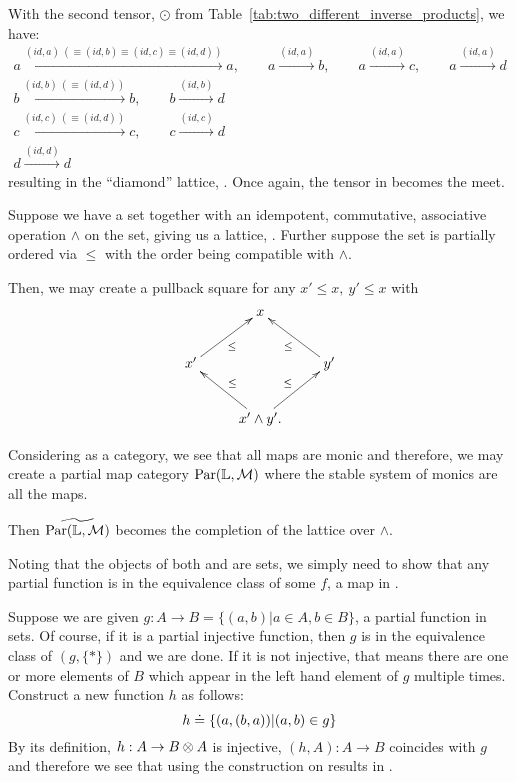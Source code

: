 With the second tensor, $\odot$ from Table~\ref{tab:two_different_inverse_products}, we have:
\begin{align*}
  a \xrightarrow{(id,a) \ (\equiv (id, b) \equiv (id,c) \equiv (id,d))} a, \qquad
    a \xrightarrow{(id,a)} b, \qquad a \xrightarrow{(id, a)} c , \qquad a \xrightarrow{(id, a)} d \\
  b \xrightarrow{(id,b) \ (\equiv (id, d))} b ,  \qquad b \xrightarrow{(id,b)} d\\
  c \xrightarrow{(id, c) \ (\equiv (id, d))} c,   \qquad c \xrightarrow{(id,c)} d\\
  d \xrightarrow{(id,d)} d
\end{align*}
resulting in the ``diamond'' lattice, . Once again, the tensor in \D becomes the meet.

\begin{example}\label{example:lattice_completion}
  Suppose we have a set together with an idempotent, commutative, associative operation $\wedge$ on
  the set, giving us a lattice, \Lat. Further suppose the set is partially ordered via $\le$ with
  the order being compatible with $\wedge$.

  Then, we may create a pullback square for any $x' \le x,\ y' \le x$ with
  \[
    \xymatrix{
      &x\\
      x' \ar[ur]_{\le} & & y' \ar[ul]^{\le}\\
      &x'\wedge y'.  \ar[ul]_{\le} \ar[ur]^{\le}
    }
  \]

  Considering \Lat as a category, we see that all maps are monic and therefore, we may create a
  partial map category $\text{Par}(\mathbb{L},\mathcal{M})$ where the stable system of monics are all the maps.

  Then $\widetilde{\text{Par}(\mathbb{L},\mathcal{M})}$ becomes the completion of the lattice over $\wedge$.
\end{example}
\begin{example}\label{ex:tilde_pinj_is_par}
  Noting that the objects of both \pinj and \Par are sets, we simply need to show that any partial
  function is in the equivalence class of some $f$, a map in \pinj.

  Suppose we are given $g : A \to B = \{(a,b) | a \in A, b\in B\}$, a partial function in sets. Of
  course, if it is a partial injective function, then $g$ is in the equivalence class of $(g,\{*\})$
  and we are done.  If it is not injective, that means there are one or more elements of $B$ which
  appear in the left hand element of $g$ multiple times. Construct a new function $h$ as follows:
  \begin{equation}
     h \doteq \{(a,(b,a)) | (a,b) \in g\} \label{eq:new_partial_injective}
  \end{equation}
  By its definition, $h : A \to B \otimes A$ is injective, $(h,A): A \to B$ coincides with $g$ and therefore
  we see that using the \wtc construction on \pinj results in \Par.
\end{example}




